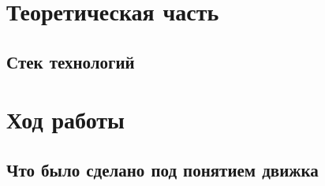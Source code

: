 \documentclass[coursework]{SCWorks}
\begin{document}

\date{2026}

\maketitle

\secNumbering

\tableofcontents




\intro

\section{Теоретическая часть}
\subsection{Стек технологий}

\section{Ход работы}
\subsection{Что было сделано под понятием движка}

\end{document}
